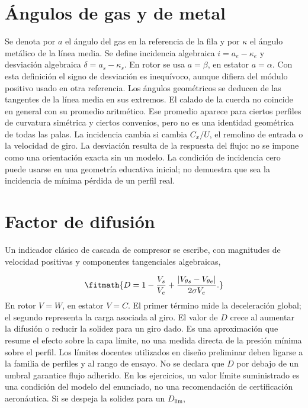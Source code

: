 \documentclass[10pt,openany]{book}
\begin{document}
\section{Ángulos de gas y de metal}

Se denota por \(a\) el ángulo del gas en la referencia de la fila y por \(\kappa\) el ángulo metálico de la línea media. Se define incidencia algebraica \(i=a_e-\kappa_e\) y desviación algebraica \(\delta=a_s-\kappa_s\). En rotor se usa \(a=\beta\), en estator \(a=\alpha\). Con esta definición el signo de desviación es inequívoco, aunque difiera del módulo positivo usado en otra referencia.
Los ángulos geométricos se deducen de las tangentes de la línea media en sus extremos. El calado de la cuerda no coincide en general con su promedio aritmético. Ese promedio aparece para ciertos perfiles de curvatura simétrica y ciertos convenios, pero no es una identidad geométrica de todas las palas.
La incidencia cambia si cambia \(C_x/U\), el remolino de entrada o la velocidad de giro. La desviación resulta de la respuesta del flujo: no se impone como una orientación exacta sin un modelo. La condición de incidencia cero puede usarse en una geometría educativa inicial; no demuestra que sea la incidencia de mínima pérdida de un perfil real.

\section{Factor de difusión}

Un indicador clásico de cascada de compresor se escribe, con magnitudes de velocidad positivas y componentes tangenciales algebraicas,

\[
\fitmath{D=1-\frac{V_s}{V_e}+\frac{|V_{\theta s}-V_{\theta e}|}{2\sigma V_e}.}
\]
En rotor \(V=W\), en estator \(V=C\). El primer término mide la deceleración global; el segundo representa la carga asociada al giro. El valor de \(D\) crece al aumentar la difusión o reducir la solidez para un giro dado. Es una aproximación que resume el efecto sobre la capa límite, no una medida directa de la presión mínima sobre el perfil.
Los límites docentes utilizados en diseño preliminar deben ligarse a la familia de perfiles y al rango de ensayo. No se declara que \(D\) por debajo de un umbral garantice flujo adherido. En los ejercicios, un valor límite suministrado es una condición del modelo del enunciado, no una recomendación de certificación aeronáutica.
Si se despeja la solidez para un \(D_{\mathrm{lim}}\),
\end{document}
